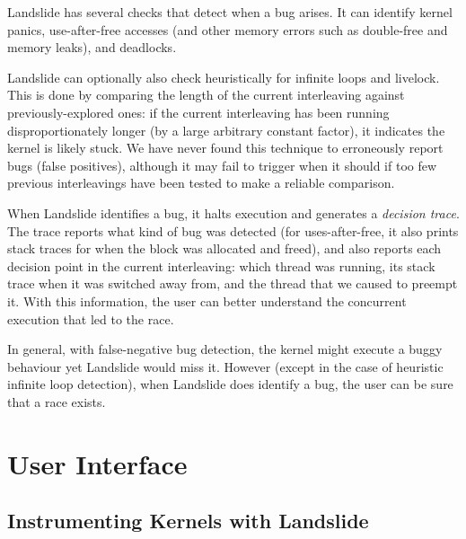 \documentclass{llncs}
\begin{document}
Landslide has several checks that detect when a bug arises. It can identify kernel panics, use-after-free accesses (and other memory errors such as double-free and memory leaks), and deadlocks.

Landslide can optionally also check heuristically for infinite loops and livelock. This is done by comparing the length of the current interleaving against previously-explored ones: if the current interleaving has been running disproportionately longer (by a large arbitrary constant factor), it indicates the kernel is likely stuck.
We have never found this technique to erroneously report bugs (false positives), although it may fail to trigger when it should if too few previous interleavings have been tested to make a reliable comparison.

When Landslide identifies a bug, it halts execution and generates a {\em decision trace}. The trace reports what kind of bug was detected (for uses-after-free, it also prints stack traces for when the block was allocated and freed), and also reports each decision point in the current interleaving: which thread was running, its stack trace when it was switched away from, and the thread that we caused to preempt it. With this information, the user can better understand the concurrent execution that led to the race.

In general, with false-negative bug detection, the kernel might execute a buggy behaviour yet Landslide would miss it. However (except in the case of heuristic infinite loop detection), when Landslide does identify a bug, the user can be sure that a race exists.


\section{User Interface}
\label{sec:interface}

\subsection{Instrumenting Kernels with Landslide}
\label{sec:instrument}
\end{document}
